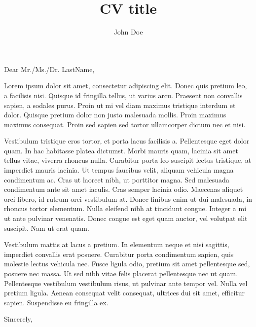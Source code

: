 \documentclass[12pt, a4paper, coverletter]{effectivecv}
\author{John Doe}
\title{CV title}
\begin{document}
\cvheader




Dear Mr./Ms./Dr. LastName,

Lorem ipsum dolor sit amet, consectetur adipiscing elit. Donec quis pretium leo, a facilisis nisi. Quisque id fringilla tellus, ut varius arcu. Praesent non convallis sapien, a sodales purus. Proin ut mi vel diam maximus tristique interdum et dolor. Quisque pretium dolor non justo malesuada mollis. Proin maximus maximus consequat. Proin sed sapien sed tortor ullamcorper dictum nec et nisi.

Vestibulum tristique eros tortor, et porta lacus facilisis a. Pellentesque eget dolor quam. In hac habitasse platea dictumst. Morbi mauris quam, lacinia sit amet tellus vitae, viverra rhoncus nulla. Curabitur porta leo suscipit lectus tristique, at imperdiet mauris lacinia. Ut tempus faucibus velit, aliquam vehicula magna condimentum ac. Cras ut laoreet nibh, ut porttitor magna. Sed malesuada condimentum ante sit amet iaculis. Cras semper lacinia odio. Maecenas aliquet orci libero, id rutrum orci vestibulum at. Donec finibus enim ut dui malesuada, in rhoncus tortor elementum. Nulla eleifend nibh at tincidunt congue. Integer a mi ut ante pulvinar venenatis. Donec congue est eget quam auctor, vel volutpat elit suscipit. Nam ut erat quam.

Vestibulum mattis at lacus a pretium. In elementum neque et nisi sagittis, imperdiet convallis erat posuere. Curabitur porta condimentum sapien, quis molestie lectus vehicula nec. Fusce ligula odio, pretium sit amet pellentesque sed, posuere nec massa. Ut sed nibh vitae felis placerat pellentesque nec ut quam. Pellentesque vestibulum vestibulum risus, ut pulvinar ante tempor vel. Nulla vel pretium ligula. Aenean consequat velit consequat, ultrices dui sit amet, efficitur sapien. Suspendisse eu fringilla ex. 

Sincerely,

\end{document}
